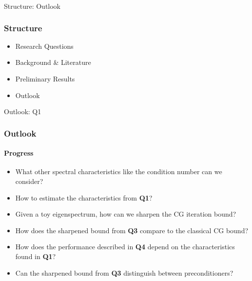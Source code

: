 \begin{frame}[label=outlook]{Structure: Outlook}
    \frametitle{Structure}
    \begin{itemize}
        \item Research Questions
        \item Background \& Literature
        \item Preliminary Results
        \item {\color{tud grapefruit}Outlook}
    \end{itemize}
\end{frame}

\begin{frame}[label=outlook]{Outlook: Q1}
    \frametitle{Outlook}
    \framesubtitle{Progress}
    \begin{itemize}
        \item<1->[\textbf{Q1}] \textcolor{tud green}{What other spectral characteristics like the condition number can we consider?}
        \item<3->[\textbf{Q2}] \textcolor{tud grapefruit}{How to estimate the characteristics from \textbf{Q1}?}
        \item<1->[\textbf{Q3}] \textcolor{tud green}{Given a toy eigenspectrum, how can we sharpen the CG iteration bound?}
        \item<2->[\textbf{Q4}] \textcolor{tud yellow}{How does the sharpened bound from \textbf{Q3} compare to the classical CG bound?}
        \item<2->[\textbf{Q5}] \textcolor{tud yellow}{How does the performance described in \textbf{Q4} depend on the characteristics found in \textbf{Q1}?}
        \item<2->[\textbf{Q6}] \textcolor{tud yellow}{Can the sharpened bound from \textbf{Q3} distinguish between preconditioners?} 
    \end{itemize}
\end{frame}




